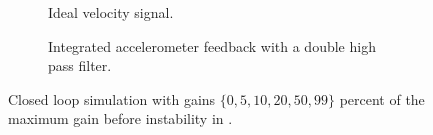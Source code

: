 \begin{figure}
  \begin{wide}
  \begin{subfigure}
    \caption{Ideal velocity signal.}
  \end{subfigure}
  \begin{subfigure}
    \caption{Integrated accelerometer feedback with a double high pass filter.}
  \end{subfigure}
  \end{wide}
  \caption{Closed loop simulation with gains $\{0, 5, 10, 20, 50, 99\}$ percent
           of the maximum gain before instability in .}
\end{figure}


